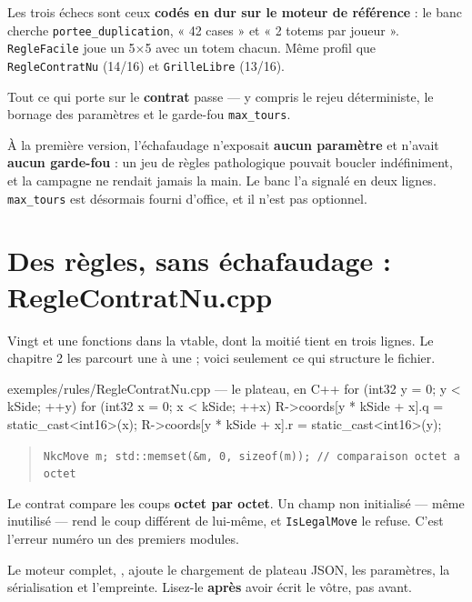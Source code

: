 Les trois échecs sont ceux \textbf{codés en dur sur le moteur de référence} : le
banc cherche \texttt{portee\_duplication}, « 42 cases » et « 2 totems par
joueur ». \texttt{RegleFacile} joue un 5$\times$5 avec un totem chacun. Même
profil que \texttt{RegleContratNu} (14/16) et \texttt{GrilleLibre} (13/16).

Tout ce qui porte sur le \textbf{contrat} passe — y compris le rejeu
déterministe, le bornage des paramètres et le garde-fou \texttt{max\_tours}.

\begin{nkretenir}
À la première version, l'échafaudage n'exposait \textbf{aucun paramètre} et
n'avait \textbf{aucun garde-fou} : un jeu de règles pathologique pouvait boucler
indéfiniment, et la campagne ne rendait jamais la main. Le banc l'a signalé en
deux lignes. \texttt{max\_tours} est désormais fourni d'office, et il n'est pas
optionnel.
\end{nkretenir}

\section{Des règles, sans échafaudage : RegleContratNu.cpp}


Vingt et une fonctions dans la vtable, dont la moitié tient en trois lignes. Le
chapitre 2 les parcourt une à une ; voici seulement ce qui structure le fichier.

\begin{nkcode}{exemples/rules/RegleContratNu.cpp — le plateau, en C++}
for (int32 y = 0; y < kSide; ++y)
    for (int32 x = 0; x < kSide; ++x) {
        R->coords[y * kSide + x].q = static_cast<int16>(x);
        R->coords[y * kSide + x].r = static_cast<int16>(y);
    }
\end{nkcode}

\begin{nkpiege}
\begin{quote}\small
\texttt{NkcMove m; std::memset(\&m, 0, sizeof(m));  // comparaison octet a octet}
\end{quote}

Le contrat compare les coups \textbf{octet par octet}. Un champ non initialisé —
même inutilisé — rend le coup différent de lui-même, et \texttt{IsLegalMove} le
refuse. C'est l'erreur numéro un des premiers modules.
\end{nkpiege}

Le moteur complet, , ajoute le
chargement de plateau JSON, les paramètres, la sérialisation et l'empreinte.
Lisez-le \textbf{après} avoir écrit le vôtre, pas avant.


